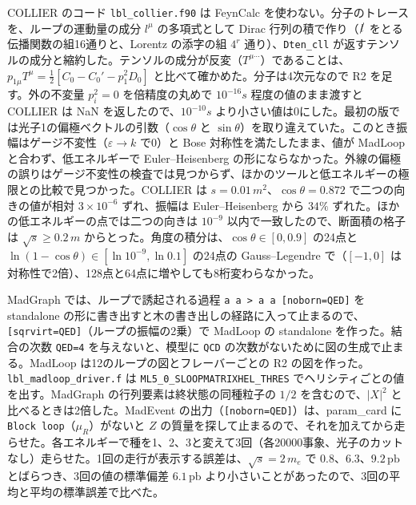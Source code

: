 \documentclass[a4paper,10pt]{ltjsarticle}
\begin{document}
COLLIER のコード \texttt{lbl\_collier.f90} は FeynCalc を使わない。分子のトレースを、ループの運動量の成分 $l^\mu$ の多項式として Dirac 行列の積で作り（$\slashed l$ をとる伝播関数の組16通りと、Lorentz の添字の組 $4^r$ 通り）、\texttt{Dten\_cll} が返すテンソルの成分と縮約した。テンソルの成分が反変（$T^{\mu\cdots}$）であることは、$p_{1\mu}T^\mu=\frac12[C_0-C_0'-p_1^2D_0]$ と比べて確かめた。分子は4次元なので R2 を足す。外の不変量 $p_i^2=0$ を倍精度の丸めで $10^{-16}s$ 程度の値のまま渡すと COLLIER は NaN を返したので、$10^{-10}s$ より小さい値は0にした。最初の版では光子1の偏極ベクトルの引数（$\cos\theta$ と $\sin\theta$）を取り違えていた。このとき振幅はゲージ不変性（$\varepsilon\to k$ で0）と Bose 対称性を満たしたまま、値が MadLoop と合わず、低エネルギーで Euler--Heisenberg の形にならなかった。外線の偏極の誤りはゲージ不変性の検査では見つからず、ほかのツールと低エネルギーの極限との比較で見つかった。COLLIER は $s=0.01\,m^2$、$\cos\theta=0.872$ で二つの向きの値が相対 $3\times10^{-6}$ ずれ、振幅は Euler--Heisenberg から $34\%$ ずれた。ほかの低エネルギーの点では二つの向きは $10^{-9}$ 以内で一致したので、断面積の格子は $\sqrt s\ge0.2\,m$ からとった。角度の積分は、$\cos\theta\in[0,0.9]$ の24点と $\ln(1-\cos\theta)\in[\ln10^{-9},\ln0.1]$ の24点の Gauss--Legendre で（$[-1,0]$ は対称性で2倍）、128点と64点に増やしても8桁変わらなかった。

MadGraph では、ループで誘起される過程 \texttt{a a > a a [noborn=QED]} を standalone の形に書き出すと木の書き出しの経路に入って止まるので、\texttt{[sqrvirt=QED]}（ループの振幅の2乗）で MadLoop の standalone を作った。結合の次数 \texttt{QED=4} を与えないと、模型に \texttt{QCD} の次数がないために図の生成で止まる。MadLoop は12のループの図とフレーバーごとの R2 の図を作った。\texttt{lbl\_madloop\_driver.f} は \texttt{ML5\_0\_SLOOPMATRIXHEL\_THRES} でヘリシティごとの値を出す。MadGraph の行列要素は終状態の同種粒子の $1/2$ を含むので、$|X|^2$ と比べるときは2倍した。MadEvent の出力（\texttt{[noborn=QED]}）は、param\_card に \texttt{Block loop}（$\mu_R$）がないと $Z$ の質量を探して止まるので、それを加えてから走らせた。各エネルギーで種を1、2、3と変えて3回（各20000事象、光子のカットなし）走らせた。1回の走行が表示する誤差は、$\sqrt s=2\,m_e$ で $0.8$、$6.3$、$9.2\,\mathrm{pb}$ とばらつき、3回の値の標準偏差 $6.1\,\mathrm{pb}$ より小さいことがあったので、3回の平均と平均の標準誤差で比べた。
\end{document}
